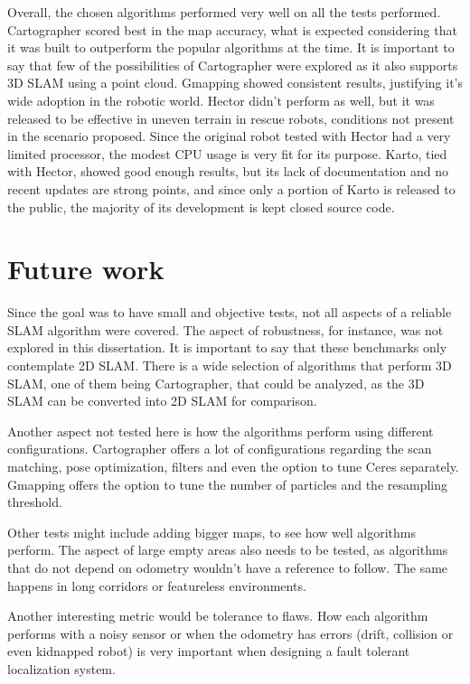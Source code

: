 Overall, the chosen algorithms performed very well on all the tests performed. Cartographer scored best in the map accuracy, what is expected considering that it was built to outperform the popular algorithms at the time. It is important to say that few of the possibilities of Cartographer were explored as it also supports 3D SLAM using a point cloud. Gmapping showed consistent results, justifying it's wide adoption in the robotic world. Hector didn't perform as well, but it was released to be effective in uneven terrain in rescue robots, conditions not present in the scenario proposed. Since the original robot tested with Hector had a very limited processor, the modest CPU usage is very fit for its purpose. Karto, tied with Hector, showed good enough results, but its lack of documentation and no recent updates are strong points, and since only a portion of Karto is released to the public, the majority of its development is kept closed source code.

\section{Future work}

Since the goal was to have small and objective tests, not all aspects of a reliable SLAM algorithm were covered. The aspect of robustness, for instance, was not explored in this dissertation. It is important to say that these benchmarks only contemplate 2D SLAM. There is a wide selection of algorithms that perform 3D SLAM, one of them being Cartographer, that could be analyzed, as the 3D SLAM can be converted into 2D SLAM for comparison.

Another aspect not tested here is how the algorithms perform using different configurations. Cartographer offers a lot of configurations regarding the scan matching, pose optimization, filters and even the option to tune Ceres separately. Gmapping offers the option to tune the number of particles and the resampling threshold.

Other tests might include adding bigger maps, to see how well algorithms perform. The aspect of large empty areas also needs to be tested, as algorithms that do not depend on odometry wouldn't have a reference to follow. The same happens in long corridors or featureless environments.

Another interesting metric would be tolerance to flaws. How each algorithm performs with a noisy sensor or when the odometry has errors (drift, collision or even kidnapped robot) is very important when designing a fault tolerant localization system.


